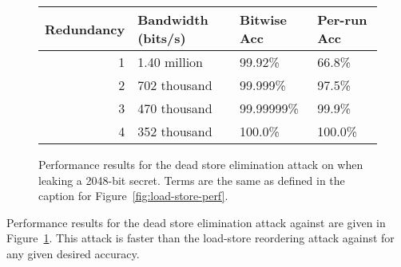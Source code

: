\begin{figure}
  \small
  \begin{tabular}{ r | l | l | l }
    Redundancy & Bandwidth (bits/s) & Bitwise Acc & Per-run Acc \\ \hline
    1          & 1.40 million       & 99.92\%     & 66.8\%      \\
    2          & 702 thousand       & 99.999\%    & 97.5\%      \\
    3          & 470 thousand       & 99.99999\%  & 99.9\%       \\
    4          & 352 thousand       & 100.0\%     & 100.0\%      \\
  \end{tabular}
  \caption{
    Performance results for the dead store elimination attack on {\CLANG} when
    leaking a 2048-bit secret.
    Terms are the same as defined in the caption for Figure~\ref{fig:load-store-perf}.
  }
  \label{fig:clang-dse-perf}
\end{figure}

Performance results for the dead store elimination attack against {\CLANG}
are given in Figure~\ref{fig:clang-dse-perf}.
This attack is faster than the load-store reordering attack against {\GCC} for
any given desired accuracy.


